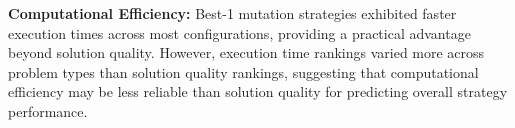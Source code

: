 \documentclass{article}
\begin{document}
\textbf{Computational Efficiency:} Best-1 mutation strategies exhibited faster execution times across most configurations, providing a practical advantage beyond solution quality. However, execution time rankings varied more across problem types than solution quality rankings, suggesting that computational efficiency may be less reliable than solution quality for predicting overall strategy performance.

\clearpage



\end{document}

